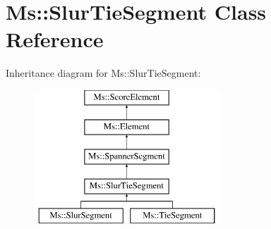 \hypertarget{class_ms_1_1_slur_tie_segment}{}\section{Ms\+:\+:Slur\+Tie\+Segment Class Reference}
\label{class_ms_1_1_slur_tie_segment}
Inheritance diagram for Ms\+:\+:Slur\+Tie\+Segment\+:\begin{figure}[H]
\begin{center}
\leavevmode
\includegraphics[height=5.000000cm]{class_ms_1_1_slur_tie_segment}
\end{center}
\end{figure}
